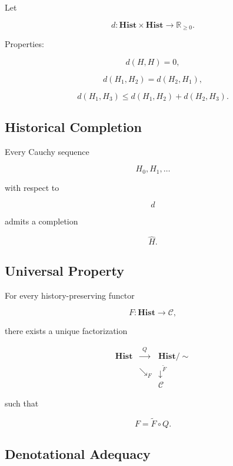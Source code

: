 \documentclass[12pt,oneside]{article}
\theoremstyle{definition}
\theoremstyle{remark}
\begin{document}
Let

\[
d
:
\mathbf{Hist}
\times
\mathbf{Hist}
\rightarrow
\mathbb R_{\ge0}.
\]

Properties:

\[
d(H,H)=0,
\]

\[
d(H_1,H_2)
=
d(H_2,H_1),
\]

\[
d(H_1,H_3)
\le
d(H_1,H_2)
+
d(H_2,H_3).
\]

\subsection*{Historical Completion}

Every Cauchy sequence

\[
H_0,
H_1,
\ldots
\]

with respect to

\[
d
\]

admits a completion

\[
\widehat H.
\]

\subsection*{Universal Property}

For every history-preserving functor

\[
F
:
\mathbf{Hist}
\rightarrow
\mathcal C,
\]

there exists a unique factorization

\[
\begin{array}{ccc}
\mathbf{Hist}
&
\xrightarrow{\;\;Q\;\;}
&
\mathbf{Hist}/\!\!\sim
\\[1ex]
&
\searrow_F
&
\downarrow^{\widetilde F}
\\[1ex]
&
&
\mathcal C
\end{array}
\]

such that

\[
F
=
\widetilde F
\circ
Q.
\]

\subsection*{Denotational Adequacy}
\end{document}
